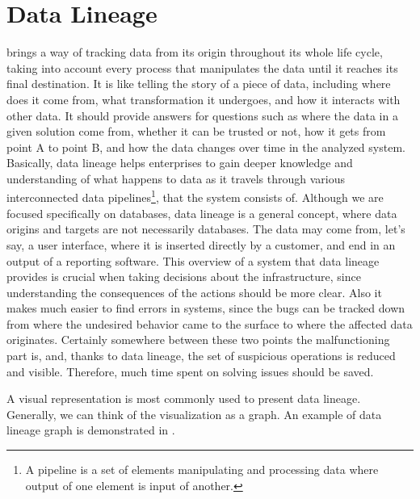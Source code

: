 \section{Data Lineage}

 brings a way of tracking data from its origin throughout its whole life cycle, taking into account every process that manipulates the data until it reaches its final destination. 
It is like telling the story of a piece of data, including where does it come from, what transformation it undergoes, and how it interacts with other data.
It should provide answers for questions such as where the data in a given solution come from, whether it can be trusted or not, how it gets from point A to point B, and how the data changes over time in the analyzed system.
Basically, data lineage helps enterprises to gain deeper knowledge and understanding of what happens to data as it travels through various interconnected data pipelines\footnote{A pipeline is a set of elements manipulating and processing data where output of one element is input of another.}, that the system consists of. Although we are focused specifically on databases, data lineage is a general concept, where data origins and targets are not necessarily databases. The data may come from, let's say, a user interface, where it is inserted directly by a customer, and end in an output of a reporting software.
This overview of a system that data lineage provides is crucial when taking decisions about the infrastructure, since understanding the consequences of the actions should be more clear. Also it makes much easier to find errors in systems, since the bugs can be tracked down from where the undesired behavior came to the surface to where the affected data originates. 
Certainly somewhere between these two points the malfunctioning part is, and, thanks to data lineage, the set of suspicious operations is reduced and visible. 
Therefore, much time spent on solving issues should be saved.

A visual representation is most commonly used to present data lineage. 
Generally, we can think of the visualization as a graph. An example of data lineage graph is demonstrated in .

